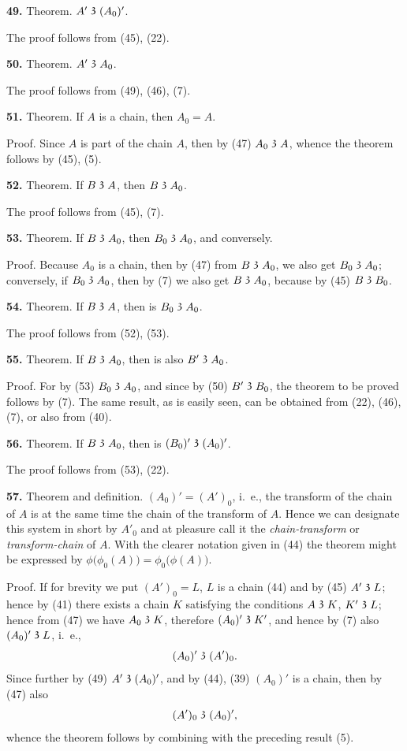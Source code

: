\documentclass[oneside]{book}
\newcommand\partof{\mathrel{\raisebox{0.45ex}{$\mathfrak{3}$}}}   %
\newcommand\mypara{\medskip\textbf}
\begin{document}
\mypara{49.} Theorem. $A' \partof (A_0)'$.

The proof follows from (45), (22).


\mypara{50.} Theorem. $A' \partof A_0$.

The proof follows from (49), (46), (7).

\mypara{51.} Theorem. If $A$ is a chain, then $A_0=A$.

Proof. Since $A$ is part of the chain $A$, then by
(47) $A_0 \partof A$, whence the theorem follows by (45), (5).

\mypara{52.} Theorem. If $B \partof A$, then $B \partof A_0$.

The proof follows from (45), (7).

\mypara{53.} Theorem. If $B \partof A_0$, then $B_0 \partof A_0$, and conversely.

Proof. Because $A_0$ is a chain, then by (47) from
$B \partof A_0$, we also get $B_0 \partof A_0$; conversely, if $B_0 \partof A_0$, then
by (7) we also get $B \partof A_0$, because by (45) $B \partof B_0$.

\mypara{54.} Theorem. If $B \partof A$, then is $B_0 \partof A_0$.

The proof follows from (52), (53).

\mypara{55.} Theorem. If $B \partof A_0$, then is also $B' \partof A_0$.

Proof. For by (53) $B_0 \partof A_0$, and since by (50) $B' \partof B_0$,
the theorem to be proved follows by (7). The same
result, as is easily seen, can be obtained from (22),
(46), (7), or also from (40).

\mypara{56.} Theorem. If $B \partof A_0$, then is $(B_0)' \partof (A_0)'$.

The proof follows from (53), (22).

\mypara{57.} Theorem and definition. $(A_0)'=(A')_0$, i.~e.,
the transform of the chain of $A$ is at the same time
the chain of the transform of $A$. Hence we can designate
this system in short by $A'_0$ and at pleasure call it
the \textit{chain-transform} or \textit{transform-chain} of $A$. With the
clearer notation given in (44) the theorem might be
expressed by $\phi\bigl(\phi_0(A)\bigr) = \phi_0\bigl(\phi(A)\bigr)$.

Proof. If for brevity we put $(A')_0=L$, $L$ is a
chain (44) and by (45) $A' \partof L$; hence by (41) there exists
a chain $K$ satisfying the conditions $A \partof K$, $K' \partof L$;
hence from (47) we have $A_0 \partof K$, therefore $(A_0)' \partof K'$,
and hence by (7) also $(A_0)' \partof L$, i.~e.,
\[
(A_0)' \partof (A')_0.
\]
Since further by (49) $A' \partof (A_0)'$, and by (44), (39)
$(A_0)'$ is a chain, then by (47) also
\[
(A')_0 \partof (A_0)',
\]
whence the theorem follows by combining with the
preceding result (5).
\end{document}
